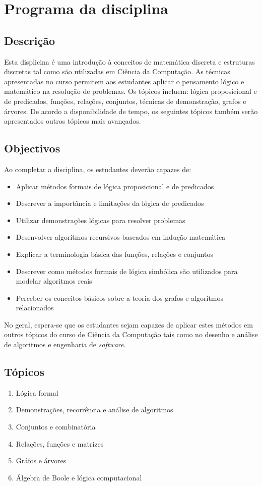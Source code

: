 \chapter*{Programa da disciplina}

\section*{Descrição}

Esta displicina é uma introdução à conceitos de matemática discreta e estruturas
discretas tal como são utilizadas em Ciência da Computação. As técnicas
apresentadas no curso permitem aos estudantes aplicar o pensamento lógico e
matemático na resolução de problemas. Os tópicos incluem: lógica proposicional
e de predicados, funções, relações, conjuntos, técnicas de demonstração, grafos
e árvores. De acordo a disponibilidade de tempo, os seguintes tópicos também
serão apresentados outros tópicos mais avançados.

\section*{Objectivos}

Ao completar a disciplina, os estudantes deverão capazes de:
\begin{itemize}
  \item Aplicar métodos formais de lógica proposicional e de predicados
  \item Descrever a importância e limitações da lógica de predicados
  \item Utilizar demonstrações lógicas para resolver problemas
  \item Desenvolver algoritmos recursivos baseados em indução matemática
  \item Explicar a terminologia básica das funções, relações e conjuntos
  \item Descrever como métodos formais de lógica simbólica são utilizados para
  modelar algoritmos reais
  \item Perceber os conceitos básicos sobre a teoria dos grafos e algoritmos relacionados\
\end{itemize} 

No geral, espera-se que os estudantes sejam capazes de aplicar estes métodos em
outros tópicos do curso de Ciência da Computação tais como no desenho e análise
de algoritmos e engenharia de \emph{software}.

\section*{Tópicos}
\begin{enumerate}
  \item Lógica formal
  \item Demonstrações, recorrência e análise de algoritmos
  \item Conjuntos e combinatória
  \item Relações, funções e matrizes
  \item Gráfos e árvores
  \item Álgebra de Boole e lógica computacional
\end{enumerate}

